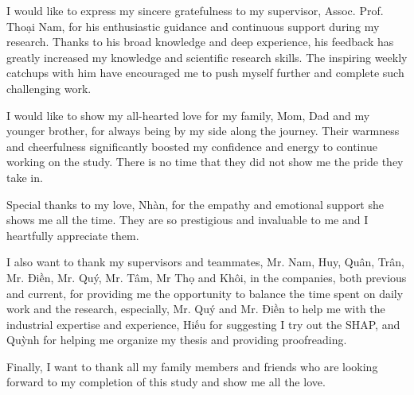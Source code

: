 I would like to express my sincere gratefulness to my supervisor, Assoc. Prof. Thoại Nam, for his enthusiastic guidance and continuous support during my research. 
Thanks to his broad knowledge and deep experience, his feedback has greatly increased my knowledge and scientific research skills.
The inspiring weekly catchups with him have encouraged me to push myself further and complete such challenging work.

I would like to show my all-hearted love for my family, Mom, Dad and my younger brother, for always being by my side along the journey.
Their warmness and cheerfulness significantly boosted my confidence and energy to continue working on the study. There is no time that they did not show me the pride they take in.

Special thanks to my love, Nhàn, for the empathy and emotional support she shows me all the time. They are so prestigious and invaluable to me and I heartfully appreciate them.

I also want to thank my supervisors and teammates, Mr. Nam, Huy, Quân, Trân, Mr. Điền, Mr. Quý, Mr. Tâm, Mr Thọ and Khôi, in the companies, both previous and current, for providing me the opportunity to balance the time spent on daily work and the research, especially, 
Mr. Quý and Mr. Điền to help me with the industrial expertise and experience,
Hiếu for suggesting I try out the SHAP, and Quỳnh for helping me organize my thesis and providing proofreading.

Finally, I want to thank all my family members and friends who are looking forward to my completion of this study and show me all the love.